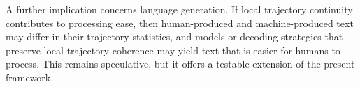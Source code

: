\documentclass[12pt]{article}
\begin{document}
A further implication concerns language generation. If local trajectory continuity contributes to processing ease, then human-produced and machine-produced text may differ in their trajectory statistics, and models or decoding strategies that preserve local trajectory coherence may yield text that is easier for humans to process. This remains speculative, but it offers a testable extension of the present framework.



\end{document}
